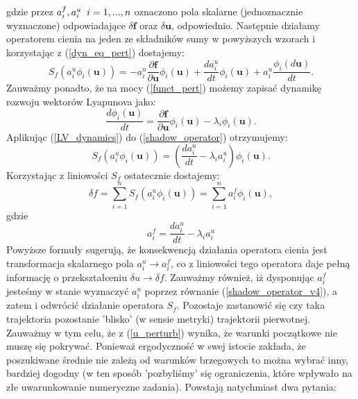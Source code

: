 \documentclass[12pt]{article}
\begin{document}
gdzie przez $ a^{f}_{i},a^{u}_{i} \thickspace \thickspace i=1,...,n$ oznaczono pola skalarne (jednoznacznie wyznaczone) odpowiadające $ \delta \textbf{f}  $ oraz $ \delta \textbf{u}  $, odpowiednio. Następnie działamy operatorem cienia na jeden ze składników sumy w powyższych wzorach i korzystając z (\ref{dyn_eq_pert}) dostajemy:
\begin{equation}
S_{f}(a^{u}_{i}\phi_{i}(\textbf{u})) = -a^{u}_{i}\frac{\partial{\textbf{f}}}{\partial{\textbf{u}}} \phi_{i}(\textbf{u}) + \frac{da^{u}_{i}}{dt}\phi_{i}(\textbf{u}) + a^{u}_{i}\frac{\phi_{i}(d\textbf{u})}{dt}.
\label{shadow_operator}
\end{equation}
Zauważmy ponadto, że na mocy (\ref{funct_pert}) możemy zapisać dynamikę rozwoju wektorów Lyapunova jako:
\begin{equation}
\frac{d\phi_{i}(\textbf{u})}{dt} = \frac{\partial{\textbf{f}}}{\partial{\textbf{u}}}\phi_{i}(\textbf{u}) - \lambda_{i}\phi_{i}(\textbf{u}).
\label{LV_dynamics}
\end{equation}
Aplikując (\ref{LV_dynamics}) do (\ref{shadow_operator}) otrzymujemy:
\begin{equation}
S_{f}(a^{u}_{i}\phi_{i}(\textbf{u})) = (\frac{da^{u}_{i}}{dt} - \lambda_{i}a^{u}_{i})\phi_{i}(\textbf{u}).
\label{shadow_operator_v2}
\end{equation}
Korzystając z liniowości $ S_{f} $ ostatecznie dostajemy:
\begin{equation}
\delta f = \sum_{i=1}^{n}S_{f}(a^{u}_{i}\phi_{i}(\textbf{u})) = \sum_{i=1}^{n}a^{f}_{i}\phi_{i}(\textbf{u}),
\label{shadow_operator_v3}
\end{equation}
gdzie 
\begin{equation}
a^{f}_{i} = \frac{da^{u}_{i}}{dt} - \lambda_{i}a^{u}_{i}
\label{shadow_operator_v4}
\end{equation}
Powyższe formuły sugerują, że konsekwencją działania operatora cienia jest transformacja skalarnego pola $ a^{u}_{i} \rightarrow a^{f}_{i} $, co z liniowości tego operatora daje pełną informację o przekształceniu $ \delta u \rightarrow \delta f $. Zauważmy również, iż dysponując $ a^{f}_{i} $ jesteśmy w stanie wyznaczyć $ a^{u}_{i} $ poprzez równanie (\ref{shadow_operator_v4}), a zatem i odwrócić działanie operatora $ S_{f} $. \newline
Pozostaje zastanowić się czy taka trajektoria pozostanie 'blisko' (w sensie metryki) trajektorii pierwotnej. Zauważmy w tym celu, że z (\ref{u_perturb}) wynika, że warunki początkowe nie muszę się pokrywać. Ponieważ ergodyczność w swej istocie zakłada, że poszukiwane średnie nie zależą od warunków brzegowych to można wybrać inny, bardziej dogodny (w ten sposób 'pozbyliśmy' się ograniczenia, które wpływało na złe uwarunkowanie numeryczne zadania). Powstają natychmiast dwa pytania:
\end{document}
